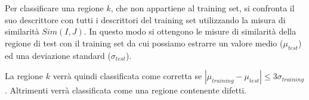 Per classificare una regione $k$, che non appartiene al training set, si confronta il suo descrittore con tutti i descrittori del training set utilizzando la misura di similarità $Sim(I, J)$. In questo modo si ottengono le misure di similarità della regione di test con il training set da cui possiamo estrarre un valore medio ($\mu_{test}$) ed una deviazione standard ($\sigma_{test}$).

La regione $k$ verrà quindi classificata come corretta se \mbox{$ |\mu_{training}- \mu_{test}| \le 3\sigma_{training}$}. Altrimenti verrà classificata come una regione contenente difetti.
\pagebreak
